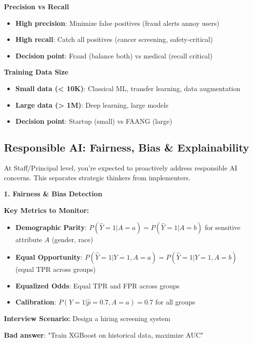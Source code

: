 \documentclass[10pt]{article}
\begin{document}
\textbf{Precision vs Recall}
\begin{itemize}
\item \textbf{High precision}: Minimize false positives (fraud alerts annoy users)
\item \textbf{High recall}: Catch all positives (cancer screening, safety-critical)
\item \textbf{Decision point}: Fraud (balance both) vs medical (recall critical)
\end{itemize}

\textbf{Training Data Size}
\begin{itemize}
\item \textbf{Small data (< 10K)}: Classical ML, transfer learning, data augmentation
\item \textbf{Large data (> 1M)}: Deep learning, large models
\item \textbf{Decision point}: Startup (small) vs FAANG (large)
\end{itemize}

\subsection{Responsible AI: Fairness, Bias \& Explainability}

At Staff/Principal level, you're expected to proactively address responsible AI concerns. This separates strategic thinkers from implementers.

\textbf{1. Fairness \& Bias Detection}

\textbf{Key Metrics to Monitor:}
\begin{itemize}
\item \textbf{Demographic Parity}: $P(\hat{Y}=1|A=a) = P(\hat{Y}=1|A=b)$ for sensitive attribute $A$ (gender, race)
\item \textbf{Equal Opportunity}: $P(\hat{Y}=1|Y=1,A=a) = P(\hat{Y}=1|Y=1,A=b)$ (equal TPR across groups)
\item \textbf{Equalized Odds}: Equal TPR and FPR across groups
\item \textbf{Calibration}: $P(Y=1|\hat{p}=0.7,A=a) = 0.7$ for all groups
\end{itemize}

\textbf{Interview Scenario:} Design a hiring screening system

\textbf{Bad answer}: "Train XGBoost on historical data, maximize AUC"
\end{document}
